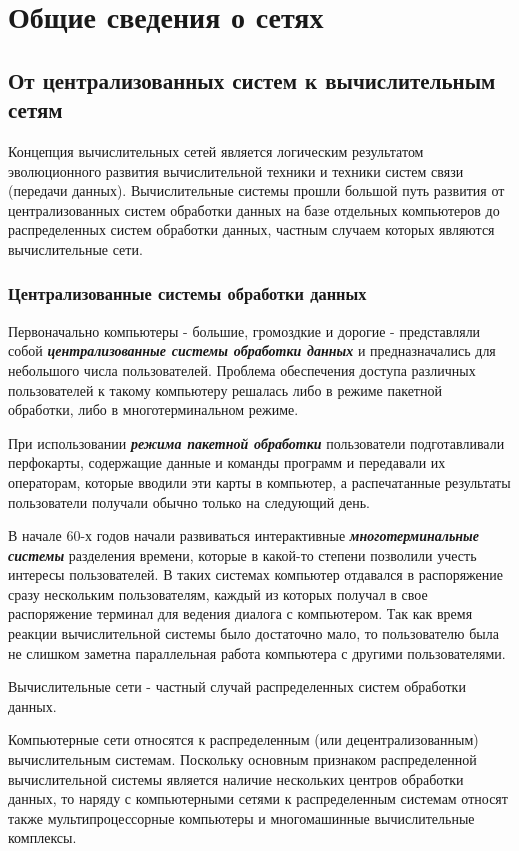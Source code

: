 \section{Общие сведения о сетях}

\subsection{От централизованных систем к вычислительным сетям}

Концепция вычислительных сетей является логическим результатом эволюционного развития вычислительной техники и техники систем связи (передачи  данных).
Вычислительные системы прошли большой путь развития от централизованных систем обработки данных на базе отдельных компьютеров до распределенных систем обработки данных, частным случаем которых являются вычислительные сети.

\subsubsection{Централизованные системы обработки данных}

Первоначально компьютеры - большие, громоздкие и дорогие - представляли собой \textbf{\textit{централизованные системы обработки данных}} и предназначались для небольшого числа пользователей.
Проблема обеспечения доступа различных пользователей к такому компьютеру решалась либо в режиме пакетной обработки, либо в многотерминальном режиме.

При использовании \textbf{\textit{режима пакетной обработки}} пользователи подготавливали перфокарты, содержащие данные и команды программ и передавали их операторам, которые вводили эти карты в компьютер, а распечатанные результаты пользователи получали обычно только на следующий день.

В начале 60-х годов начали развиваться интерактивные \textbf{\textit{многотерминальные системы}} разделения времени, которые в какой-то степени позволили учесть интересы пользователей.
В таких системах компьютер отдавался в распоряжение сразу нескольким пользователям, каждый из которых получал в свое распоряжение терминал для ведения диалога с компьютером.
Так как время реакции вычислительной системы было достаточно мало, то пользователю была не слишком заметна параллельная работа компьютера с другими пользователями.

Вычислительные сети - частный случай распределенных систем обработки данных.

Компьютерные сети относятся к распределенным (или децентрализованным) вычислительным системам. Поскольку основным признаком распределенной вычислительной системы является наличие нескольких центров обработки данных, то наряду с компьютерными сетями к распределенным системам относят также мультипроцессорные компьютеры и многомашинные вычислительные комплексы.


